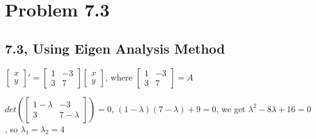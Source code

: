 \documentclass{article}
\begin{document}
\section{Problem 7.3}
\subsection{7.3, Using Eigen Analysis Method}
$\begin{bmatrix}
    x\\
    y
\end{bmatrix}'
=
\begin{bmatrix}
    1 & -3 \\
    3 & 7
\end{bmatrix}
\begin{bmatrix}
    x\\
    y
\end{bmatrix}$, where
$\begin{bmatrix}
    1 & -3 \\
    3 & 7
\end{bmatrix} = A$ \par\vspace{0.25cm}

\noindent $det(\begin{bmatrix}
    1 - \lambda & -3 \\
    3 & 7 - \lambda
\end{bmatrix}) = 0$, $(1 - \lambda)(7 - \lambda) + 9 = 0$, we get $\lambda^{2} - 8\lambda + 16 = 0$, so $\lambda_{1} = \lambda_{2} = 4$ \par\vspace{0.25cm}
\end{document}
